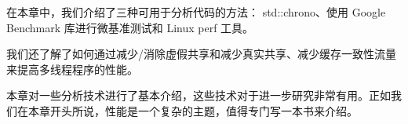 在本章中，我们介绍了三种可用于分析代码的方法： std::chrono、使用 Google Benchmark 库进行微基准测试和 Linux perf 工具。

我们还了解了如何通过减少/消除虚假共享和减少真实共享、减少缓存一致性流量来提高多线程程序的性能。

本章对一些分析技术进行了基本介绍，这些技术对于进一步研究非常有用。正如我们在本章开头所说，性能是一个复杂的主题，值得专门写一本书来介绍。